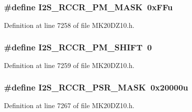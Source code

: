 \subsubsection[{\texorpdfstring{I2\+S\+\_\+\+R\+C\+C\+R\+\_\+\+P\+M\+\_\+\+M\+A\+SK}{I2S_RCCR_PM_MASK}}]{\setlength{\rightskip}{0pt plus 5cm}\#define I2\+S\+\_\+\+R\+C\+C\+R\+\_\+\+P\+M\+\_\+\+M\+A\+SK~0x\+F\+Fu}\hypertarget{group___i2_s___register___masks_gad95811918cc638479521d5b955e53cf0}{}\label{group___i2_s___register___masks_gad95811918cc638479521d5b955e53cf0}


Definition at line 7258 of file M\+K20\+D\+Z10.\+h.

\subsubsection[{\texorpdfstring{I2\+S\+\_\+\+R\+C\+C\+R\+\_\+\+P\+M\+\_\+\+S\+H\+I\+FT}{I2S_RCCR_PM_SHIFT}}]{\setlength{\rightskip}{0pt plus 5cm}\#define I2\+S\+\_\+\+R\+C\+C\+R\+\_\+\+P\+M\+\_\+\+S\+H\+I\+FT~0}\hypertarget{group___i2_s___register___masks_gaca293dbc9aa012c12c7e17e9f2e7ff8c}{}\label{group___i2_s___register___masks_gaca293dbc9aa012c12c7e17e9f2e7ff8c}


Definition at line 7259 of file M\+K20\+D\+Z10.\+h.

\subsubsection[{\texorpdfstring{I2\+S\+\_\+\+R\+C\+C\+R\+\_\+\+P\+S\+R\+\_\+\+M\+A\+SK}{I2S_RCCR_PSR_MASK}}]{\setlength{\rightskip}{0pt plus 5cm}\#define I2\+S\+\_\+\+R\+C\+C\+R\+\_\+\+P\+S\+R\+\_\+\+M\+A\+SK~0x20000u}\hypertarget{group___i2_s___register___masks_ga38a581e1743cff4f03681b86800bd7c5}{}\label{group___i2_s___register___masks_ga38a581e1743cff4f03681b86800bd7c5}


Definition at line 7267 of file M\+K20\+D\+Z10.\+h.

